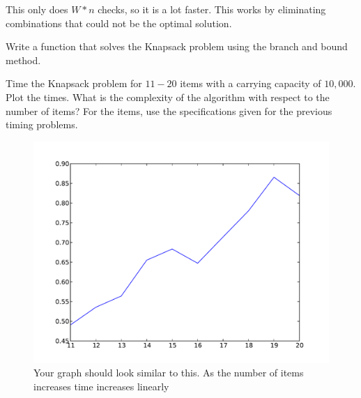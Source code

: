 This only does $W*n$ checks, so it is a lot faster.
This works by eliminating combinations that could not be the optimal solution.

\begin{problem}
Write a function that solves the Knapsack problem using the branch and bound method.
\end{problem}

\begin{problem}
Time the Knapsack problem for $11-20$ items with a carrying capacity of $10,000$.
Plot the times.
What is the complexity of the algorithm with respect to the number of items?
For the items, use the specifications given for the previous timing problems.

\begin{figure}[H]
\includegraphics[width=\textwidth]{dynamicTime.pdf}
\caption{
Your graph should look similar to this.
As the number of items increases time increases linearly}
\end{figure}
\end{problem}

